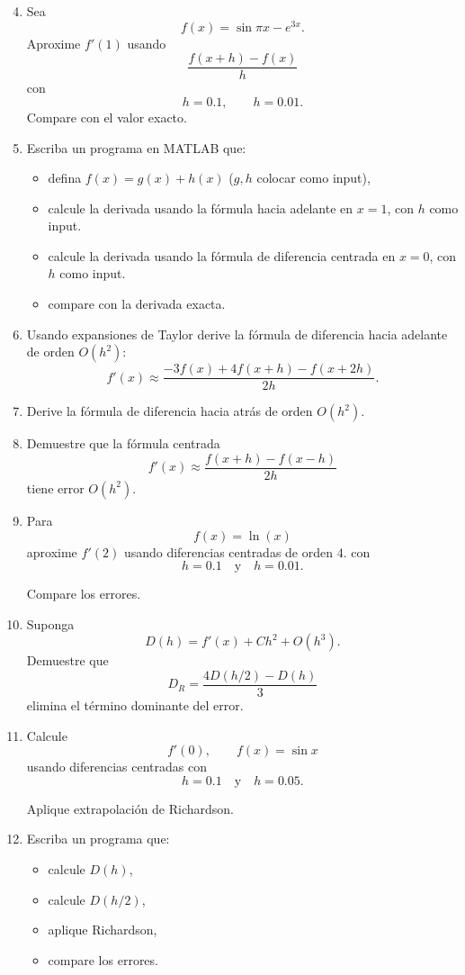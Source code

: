 \documentclass[11pt]{article}
\begin{document}
\begin{enumerate}
\setcounter{enumi}{3}

\item Sea
\[
f(x)=\sin \pi x-e^{3x}.
\]
Aproxime $f'(1)$ usando
\[
\frac{f(x+h)-f(x)}{h}
\]
con
\[
h=0.1, \qquad h=0.01.
\]
Compare con el valor exacto.

\item Escriba un programa en MATLAB que:
\begin{itemize}
\item defina $f(x)=g(x)+h(x)$ ($g,h$ colocar como input),
\item calcule la derivada usando la fórmula hacia adelante en $x=1$, con $h$ como input.
\item calcule la derivada usando la fórmula de diferencia centrada en $x=0$, con $h$ como input.
\item compare con la derivada exacta.
\end{itemize}

\item Usando expansiones de Taylor derive la fórmula de diferencia hacia adelante de orden $O(h^2)$:
\[
f'(x) \approx
\frac{-3f(x)+4f(x+h)-f(x+2h)}{2h}.
\]

\item Derive la fórmula de diferencia hacia atrás de orden $O(h^2)$.

\item Demuestre que la fórmula centrada
\[
f'(x) \approx
\frac{f(x+h)-f(x-h)}{2h}
\]
tiene error $O(h^2)$.

\item Para
\[
f(x)=\ln(x)
\]
aproxime $f'(2)$ usando diferencias centradas de orden $4$. con
\[
h=0.1 \quad \text{y} \quad h=0.01.
\]

Compare los errores.


\item Suponga
\[
D(h)=f'(x)+Ch^2+O(h^3).
\]
Demuestre que
\[
D_R=\frac{4D(h/2)-D(h)}{3}
\]
elimina el término dominante del error.

\item Calcule
\[
f'(0), \qquad f(x)=\sin x
\]
usando diferencias centradas con
\[
h=0.1 \quad \text{y} \quad h=0.05.
\]

Aplique extrapolación de Richardson.

\item Escriba un programa que:
\begin{itemize}
\item calcule $D(h)$,
\item calcule $D(h/2)$,
\item aplique Richardson,
\item compare los errores.
\end{itemize}




\end{enumerate}
\end{document}
